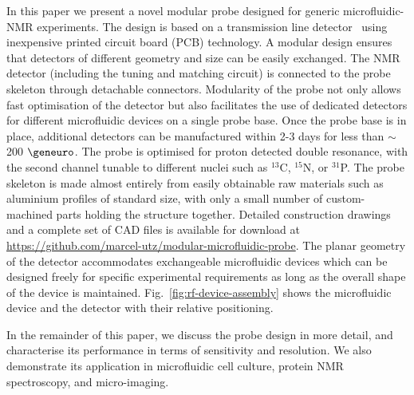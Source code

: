\documentclass[preprint,5p]{elsarticle}
\newcommand{\fig}[1]{Fig.~\ref{#1}}
\begin{document}
In this paper we present a novel modular probe designed for generic
microfluidic-NMR experiments. The design is based on a transmission line
detector~\cite{stripline_jan,gream_2016} using inexpensive
printed circuit board (PCB) technology. A modular design ensures that detectors of
different geometry and size can be easily exchanged.
The NMR detector (including the tuning and matching circuit) is connected to the probe
skeleton through detachable connectors. Modularity of the probe not only allows
fast optimisation of the detector but also facilitates the use of dedicated detectors
for different microfluidic devices on a single probe base.
Once the probe base is in place, additional detectors can be manufactured
within 2-3 days for less than $\sim$200 $\geneuro$.
The probe is optimised for proton detected double resonance, with the
second channel tunable to different nuclei such as $^{13}$C, $^{15}$N, or
$^{31}$P. The probe skeleton is made almost entirely from easily obtainable raw materials
such as aluminium profiles of standard size, with only a small number of
custom-machined parts holding the structure together.
Detailed construction drawings and a complete set of CAD files is
available for download at \url{https://github.com/marcel-utz/modular-microfluidic-probe}.
The planar geometry of the detector accommodates exchangeable microfluidic devices
which can be designed freely for specific experimental requirements as long as the
overall shape of the device is maintained. \fig{fig:rf-device-assembly} shows the microfluidic device and the detector with their relative positioning.

In the remainder of this paper, we discuss the probe design in more detail,
and characterise its performance in terms of sensitivity and resolution.
We also demonstrate its application in microfluidic cell culture,
protein NMR spectroscopy, and micro-imaging.
\end{document}
